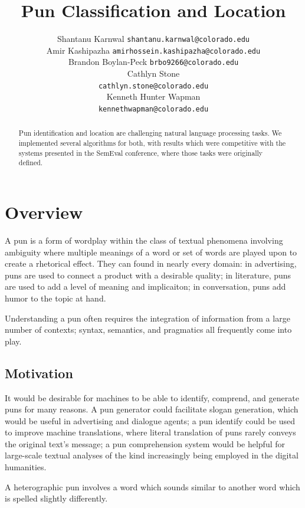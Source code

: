 \documentclass{article}
\title{Pun Classification and Location}
\author{
	Shantanu Karnwal
	\texttt{shantanu.karnwal@colorado.edu} \\
	\And
	Amir Kashipazha
	\texttt{amirhossein.kashipazha@colorado.edu} \\
	\And
	Brandon Boylan-Peck
	\texttt{brbo9266@colorado.edu} \\
	\And
	Cathlyn Stone\\
	\texttt{cathlyn.stone@colorado.edu} \\
	\And
	Kenneth Hunter Wapman\\
	\texttt{kennethwapman@colorado.edu} \\
}
\begin{document}
\maketitle

\begin{abstract}
	Pun identification and location are challenging natural language processing 
	tasks. We implemented several algorithms for both, with results which 
	were competitive with the systems presented in the SemEval conference, where
	those tasks were originally defined.
\end{abstract}


\section{Overview}

A pun is a form of wordplay within the class of textual phenomena involving
ambiguity where multiple meanings of a word or set of words are played upon to
create a rhetorical effect. They can found in nearly every domain: in
advertising, puns are used to connect a product with a desirable quality; in
literature, puns are used to add a level of meaning and implicaiton; in
conversation, puns add humor to the topic at hand.

Understanding a pun often requires the integration of information from a large
number of contexts; syntax, semantics, and pragmatics all frequently come into
play. 

\subsection{Motivation}

It would be desirable for machines to be able to identify, comprend, and
generate puns for many reasons. A pun generator could facilitate slogan
generation, which would be useful in advertising and dialogue agents; a pun
identify could be used to improve machine translations, where literal
translation of puns rarely conveys the original text's message; a pun
comprehension system would be helpful for large-scale textual analyses of the
kind increasingly being employed in the digital humanities.

A heterographic pun involves a word which sounds similar to another word which
is spelled slightly differently.
\end{document}
